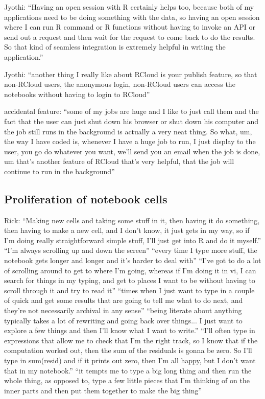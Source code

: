Jyothi: ``Having an open session with R certainly helps too, because both of my applications need to be doing something with the data, so having an open session where I can run R command or R functions without having to invoke an API or send out a request and then wait for the request to come back to do the results.  So that kind of seamless integration is extremely helpful in writing the application.''

Jyothi: ``another thing I really like about RCloud is your publish feature, so that non-RCloud users, the anonymous login, non-RCloud users can access the notebooks without having to login to RCloud''

accidental feature: ``some of my jobs are huge and I like to just call them and the fact that the user can just shut down his browser or shut down his computer and the job still runs in the background is actually a very neat thing. So what, um, the way I have coded is, whenever I have a huge job to run, I just display to the user, you go do whatever you want, we'll send you an email when the job is done, um that's another feature of RCloud that's very helpful, that the job will continue to run in the background''


\subsection{Proliferation of notebook cells}
Rick: ``Making new cells and taking some stuff in it, then having it do something, then having to make a new cell, and I don't know, it just gets in my way, so if I'm doing really straightforward simple stuff, I'll just get into R and do it myself.'' ``I'm always scrolling up and down the screen'' ``every time I type more stuff, the notebook gets longer and longer and it's harder to deal with'' ``I've got to do a lot of scrolling around to get to where I'm going, whereas if I'm doing it in vi, I can search for things in my typing, and get to places I want to be without having to scroll through it and try to read it'' ``times when I just want to type in a couple of quick and get some results that are going to tell me what to do next, and they're not necessarily archival in any sense'' ``being literate about anything typically takes a lot of rewriting and going back over things... I just want to explore a few things and then I'll know what I want to write.'' ``I'll often type in expressions that allow me to check that I'm the right track, so I know that if the computation worked out, then the sum of the residuals is gonna be zero. So I'll type in sum(resid) and if it prints out zero, then I'm all happy, but I don't want that in my notebook.'' ``it tempts me to type a big long thing and then run the whole thing, as opposed to, type a few little pieces that I'm thinking of on the inner parts and then put them together to make the big thing''

